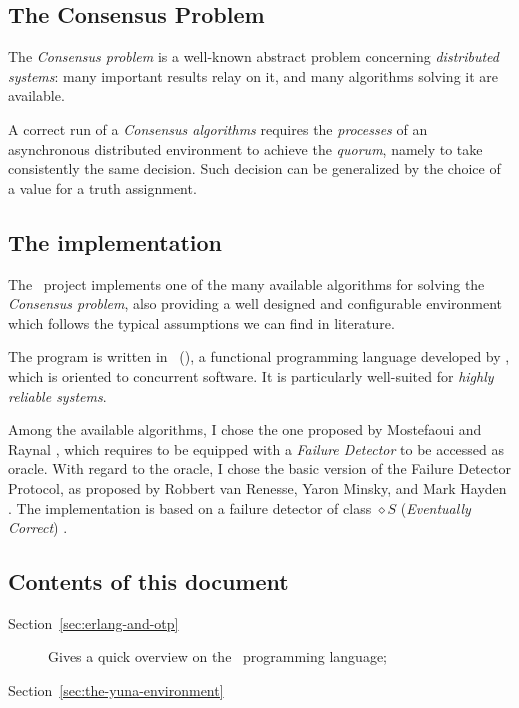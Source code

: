 \subsection{The Consensus Problem}

The \emph{Consensus problem} is a well-known abstract problem concerning
\emph{distributed systems}: many important results relay on it, and many
algorithms solving it are available.

A correct run of a \emph{Consensus algorithms} requires the
\emph{processes} of an asynchronous distributed environment to achieve the
\emph{quorum}, namely to take consistently the same decision. Such
decision can be generalized by the choice of a value for a truth
assignment.


\subsection{The implementation} \label{sub:TheImplementation}

The \YUNA\ project implements one of the many available algorithms for
solving the \emph{Consensus problem}, also providing a well designed and
configurable environment which follows the typical assumptions we can find
in literature.

The program is written in \Erlang\ (), a functional
programming language developed by , which is oriented to
concurrent software. It is particularly well-suited for \emph{highly
reliable systems}.

Among the available algorithms, I chose the one proposed by Mostefaoui and
Raynal \cite{bib:Cons}, which requires to be equipped with a \emph{Failure
Detector} to be accessed as oracle. With regard to the oracle, I chose the
basic version of the Failure Detector Protocol, as proposed by Robbert van
Renesse, Yaron Minsky, and Mark Hayden \cite{bib:FD}. The implementation
is based on a failure detector of class $\diamond S$ (\emph{Eventually
Correct}) \cite{bib:QualityFD}.

\subsection{Contents of this document}

\begin{description}

    \item[Section~\ref{sec:erlang-and-otp}] Gives a quick overview on the
        \Erlang\ programming language;

    \item[Section~\ref{sec:the-yuna-environment}]

\end{description}
